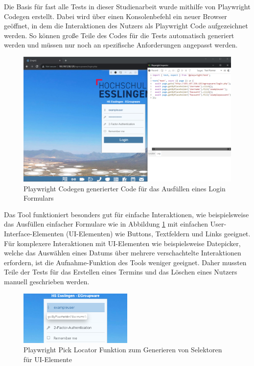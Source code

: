 Die Basis für fast alle Tests in dieser Studienarbeit wurde mithilfe von Playwright Codegen erstellt.
Dabei wird über einen Konsolenbefehl ein neuer Browser geöffnet, in dem die Interaktionen des Nutzers als Playwright Code aufgezeichnet werden.
So können große Teile des Codes für die Tests automatisch generiert werden und müssen nur noch an spezifische Anforderungen angepasst werden.
\begin{figure}[H]
    \centering
    \includegraphics[width=1\textwidth]{images/Playwright_Codegen.png}
    \caption{Playwright Codegen generierter Code für das Ausfüllen eines Login Formulars}
    \label{fig:playwright-codegen}
\end{figure}
Das Tool funktioniert besonders gut für einfache Interaktionen, wie beispielsweise das Ausfüllen einfacher Formulare wie in Abbildung \ref{fig:playwright-codegen} mit einfachen User-Interface-Elementen (UI-Elementen) wie Buttons, Textfeldern und Links geeignet.
Für komplexere Interaktionen mit UI-Elementen wie beispielsweise Datepicker, welche das Auswählen eines Datums über mehrere verschachtelte Interaktionen erfordern, ist die Aufnahme-Funktion des Tools weniger geeignet.
Daher mussten Teile der Tests für das Erstellen eines Termins und das Löschen eines Nutzers manuell geschrieben werden.

\begin{figure}[H]
    \centering
    \includegraphics[width=0.5\textwidth]{images/Playwright_PickLocator.png}
    \caption{Playwright Pick Locator Funktion zum Generieren von Selektoren für UI-Elemente}
    \label{fig:playwright-pick-locator}
\end{figure}

